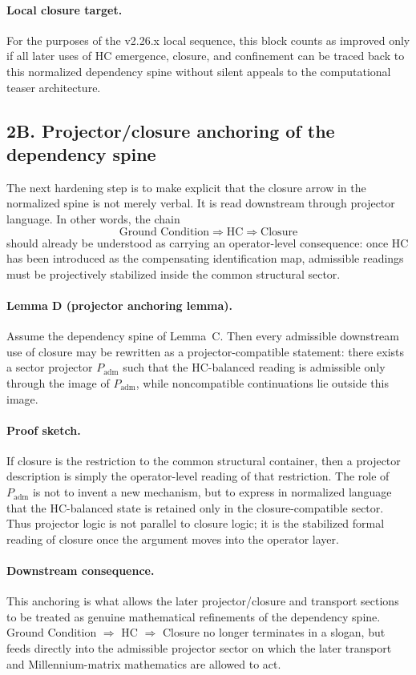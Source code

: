 \paragraph{Local closure target.}
For the purposes of the v2.26.x local sequence, this block counts as improved
only if all later uses of HC emergence, closure, and confinement can be traced
back to this normalized dependency spine without silent appeals to the
computational teaser architecture.

\subsection*{2B. Projector/closure anchoring of the dependency spine}
The next hardening step is to make explicit that the closure arrow in the
normalized spine is not merely verbal. It is read downstream through projector
language. In other words, the chain
\[
\text{Ground Condition} \Longrightarrow \text{HC} \Longrightarrow \text{Closure}
\]
should already be understood as carrying an operator-level consequence: once HC
has been introduced as the compensating identification map, admissible readings
must be projectively stabilized inside the common structural sector.

\paragraph{Lemma D (projector anchoring lemma).}
Assume the dependency spine of Lemma~C. Then every admissible downstream use of
closure may be rewritten as a projector-compatible statement: there exists a
sector projector $P_{\mathrm{adm}}$ such that the HC-balanced reading is
admissible only through the image of $P_{\mathrm{adm}}$, while noncompatible
continuations lie outside this image.

\paragraph{Proof sketch.}
If closure is the restriction to the common structural container, then a
projector description is simply the operator-level reading of that restriction.
The role of $P_{\mathrm{adm}}$ is not to invent a new mechanism, but to express
in normalized language that the HC-balanced state is retained only in the
closure-compatible sector. Thus projector logic is not parallel to closure
logic; it is the stabilized formal reading of closure once the argument moves
into the operator layer.

\paragraph{Downstream consequence.}
This anchoring is what allows the later projector/closure and transport sections
to be treated as genuine mathematical refinements of the dependency spine.
Ground Condition $\Rightarrow$ HC $\Rightarrow$ Closure no longer terminates in
a slogan, but feeds directly into the admissible projector sector on which the
later transport and Millennium-matrix mathematics are allowed to act.

